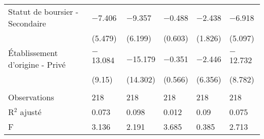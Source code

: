\documentclass[
]{book}
\begin{document}
\begin{landscape}
\begin{ThreePartTable}
\begin{longtable}[t]{llllll}
Statut de boursier - Secondaire & $-$7.406 & $-$9.357 & $-$0.488 & $-$2.438 & $-$6.918\\
 & (5.479) & (6.199) & (0.603) & (1.826) & (5.097)\\
Établissement d'origine - Privé & $-$13.084 & $-$15.179 & $-$0.351 & $-$2.446 & $-$12.732\\
 & (9.15) & (14.302) & (0.566) & (6.356) & (8.782)\\
 &  &  &  &  & \\
Observations & 218 & 218 & 218 & 218 & 218\\
R$^2$ ajusté & 0.073 & 0.098 & 0.012 & 0.09 & 0.075\\
F & 3.136 & 2.191 & 3.685 & 0.385 & 2.713\\*
\end{longtable}
\end{ThreePartTable}
\endgroup{}
\end{landscape}
\end{document}
